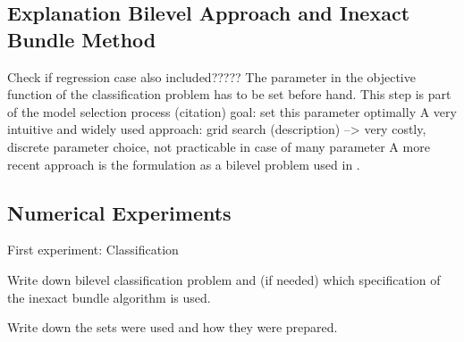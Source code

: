 \subsection{Explanation Bilevel Approach and Inexact Bundle Method}
Check if regression case also included?????
The parameter in the objective function of the classification problem has to be set before hand. This step is part of the model selection process (citation)
goal: set this parameter optimally
A very intuitive and widely used approach: grid search (description) --> very costly, discrete parameter choice, not practicable in case of many parameter
A more recent approach is the formulation as a bilevel problem used in \cite{Kunapuli2008, Moore2011}.




\subsection{Numerical Experiments}

First experiment: Classification

Write down bilevel classification problem and (if needed) which specification of the inexact bundle algorithm is used.

Write down the sets were used and how they were prepared.



